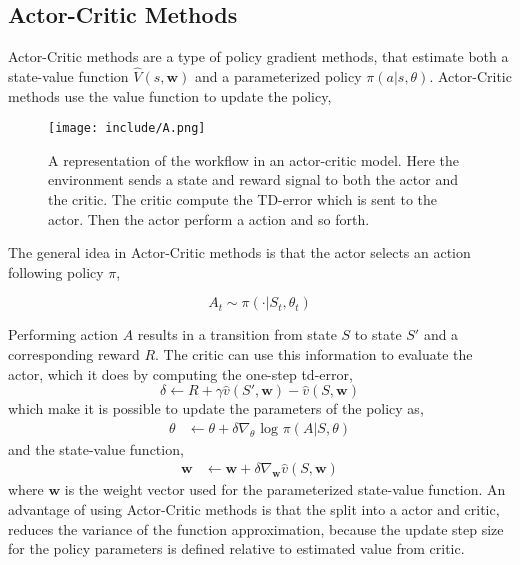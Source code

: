 \documentclass[11pt]{article}
\begin{document}
\subsection{Actor-Critic Methods}

Actor-Critic methods are a type of policy gradient methods, that estimate both a state-value function $\hat{V}(s, \mathbf{w})$ and a parameterized policy $\pi(a | s, \theta)$. Actor-Critic methods use the value function to update the policy,

\begin{figure}[!h]
    \centering
    \texttt{[image: include/A.png]}
    \caption{A representation of the workflow in an actor-critic
    model. Here the environment sends a state and reward signal to both the actor and the critic. The critic compute the TD-error which is sent to the actor.
    Then the actor perform a action and so forth.}
    \label{fig:actor-critic}
\end{figure}

The general idea in Actor-Critic methods is that the actor selects an action following policy $\pi$,

\begin{equation}
    A_{t} \sim \pi(\cdot | S_{t}, \theta_{t})
\end{equation}

Performing action $A$ results in a transition from state $S$ to state $S'$ and a corresponding reward $R$. The critic can use this information to evaluate the actor, which it does by computing the one-step td-error,
\begin{equation}
    \delta \leftarrow R + \gamma \hat{v} (S', \mathbf{w}) - \hat{v}(S, \mathbf{w})
\end{equation}
which make it is possible to update the parameters of the policy as,
\begin{equation}
\begin{split}
    \theta &\leftarrow \theta + \delta \nabla_{\theta} \text{ log } \pi(A | S, \theta)
\end{split}
\end{equation}
and the state-value function,
\begin{equation}
\begin{split}
    \mathbf{w} &\leftarrow \mathbf{w} + \delta \nabla_{\mathbf{w}} \hat{v}(S, \mathbf{w})
\end{split}
\end{equation}
where $\mathbf{w}$ is the weight vector used for the parameterized state-value function.
An advantage of using Actor-Critic methods is that the split into a actor and critic, reduces the variance of the function approximation, because the update step size for the policy parameters is defined relative to estimated value from critic.\cite{actCrit}
\end{document}
